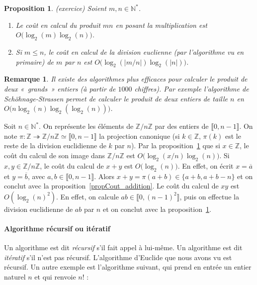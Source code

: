 \documentclass[12pt]{report}
\newtheorem{remarque}[thm]{Remarque}
\newtheorem{proposition}[thm]{Proposition}
\newcommand{\N}{\mathbb{N}}
\newcommand{\Z}{\mathbb{Z}}
\begin{document}
\begin{proposition}\label{propCout_multiplication}(exercice)
Soient $m,n\in \N^*$. \begin{enumerate}
\item Le coût en calcul du produit  $mn$ en posant la multiplication est $O\big(\log_2(m)\log_2(n)\big)$. 

\item Si $m\leq n$, le coût en calcul de la division euclienne (par l'algorithme vu en primaire) de $m$ par $n$ est $O\big(\log_2(|m/n|)\log_2(|n|)\big)$.

\end{enumerate} 


\end{proposition}

\begin{remarque}
Il existe des algorithmes plus efficaces pour calculer le produit de deux «~grands~» entiers (à partir de $1000$ chiffres). Par exemple l'algorithme de Schöhnage-Strassen permet de calculer le produit de deux entiers de taille $n$ en $O(n\log_2(n)\log_2(\log_2(n))\big)$.
\end{remarque}



Soit $n\in \N^*$. On représente les éléments de $\Z/n\Z$ par des entiers de $\llbracket 0,n-1\rrbracket$. On note $\pi:\Z\twoheadrightarrow \Z/n\Z\simeq \llbracket 0,n-1\rrbracket$ la projection canonique (si $k\in \Z$, $\pi(k)$ est le reste de la division euclidienne de $k$ par $n$). Par la proposition~\ref{propCout_multiplication} que si $x\in \Z$, le coût du calcul de son image dans $\Z/n\Z$ est $O\big(\log_2(x/n)\log_2(n)\big)$.  Si $x,y\in \Z/n\Z$, le coût du calcul de $x+y$ est $O\big(\log_2(n)\big)$. En effet, on écrit $x=\overline{a}$ et $y=\overline{b}$, avec $a,b\in \llbracket 0,n-1\rrbracket$. Alors $x+y=\pi(a+b)\in \{a+b,a+b-n\}$ et on conclut avec la proposition~\ref{propCout_addition}. Le coût du calcul de $xy$ est $O(\log_2(n)^2)$. En effet, on calcule $ab\in \llbracket 0,(n-1)^2\rrbracket$, puis on effectue la division euclidienne de $ab$ par $n$ et on conclut avec la proposition~\ref{propCout_multiplication}.

\paragraph{Algorithme récursif ou itératif}

Un algorithme est dit \textit{récursif} s'il fait appel à lui-même. Un algorithme est dit \textit{itératif} s'il n'est pas récursif. L'algorithme d'Euclide que nous avons vu est récursif. Un autre exemple est l'algorithme suivant, qui prend en entrée un entier naturel $n$ et qui renvoie $n!$ :
\end{document}
